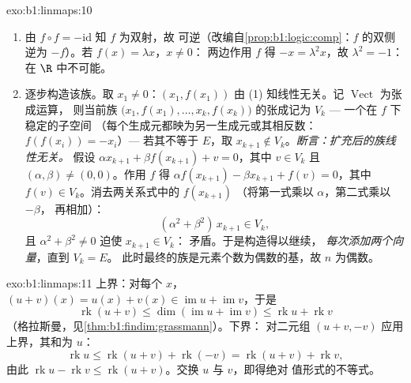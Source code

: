 \begin{solution}{exo:b1:linmaps:10}
\begin{enumerate}
  \item 由 $f \circ f = -\mathrm{id}$ 知 $f$ 为双射，故
        可逆（改编自\cref{prop:b1:logic:comp}：$f$ 的双侧
        逆为 $-f$）。若 $f(x) = \lambda x$，$x \neq 0$：
        两边作用 $f$ 得 $-x = \lambda^2 x$，故 $\lambda^2 = -1$：
        在 $\R$ 中不可能。
  \item 逐步构造该族。取 $x_1 \neq 0$：$(x_1,
        f(x_1))$ 由 (1) 知线性无关。记 $\operatorname{Vect}$ 为张成运算，
        则当前族 $\bigl(x_1, f(x_1), \dots, x_k,
        f(x_k)\bigr)$ 的张成记为 $V_k$ --- 一个在 $f$ 下稳定的子空间
        （每个生成元都映为另一生成元或其相反数：
        $f(f(x_i)) = -x_i$）--- 若其不等于 $E$，取 $x_{k+1}
        \notin V_k$。\emph{断言：扩充后的族线性无关。}
        假设 $\alpha x_{k+1} + \beta f(x_{k+1}) + v = 0$，其中 $v
        \in V_k$ 且 $(\alpha, \beta) \neq (0,0)$。作用 $f$ 得
        $\alpha f(x_{k+1}) - \beta x_{k+1} + f(v) = 0$，其中 $f(v)
        \in V_k$。消去两关系式中的 $f(x_{k+1})$
        （将第一式乘以 $\alpha$，第二式乘以 $-\beta$，
        再相加）：
        \[
        (\alpha^2 + \beta^2)\, x_{k+1} \in V_k ,
        \]
        且 $\alpha^2 + \beta^2 \neq 0$ 迫使 $x_{k+1} \in V_k$：
        矛盾。于是构造得以继续，
        \emph{每次添加两个向量}，直到 $V_k = E$。
        此时最终的族是元素个数为偶数的基，故 $n$ 为偶数。
\end{enumerate}
\end{solution}

\begin{solution}{exo:b1:linmaps:11}
上界：对每个 $x$，$(u + v)(x) = u(x) + v(x) \in
\operatorname{im} u + \operatorname{im} v$，于是
\[
\operatorname{rk}(u + v)
\leq \dim(\operatorname{im} u + \operatorname{im} v)
\leq \operatorname{rk} u + \operatorname{rk} v
\]
（格拉斯曼，见\cref{thm:b1:findim:grassmann}）。下界：
对二元组 $(u + v, -v)$ 应用上界，其和为 $u$：
\[
\operatorname{rk} u \leq \operatorname{rk}(u + v) +
\operatorname{rk}(-v) = \operatorname{rk}(u + v) +
\operatorname{rk} v,
\]
由此 $\operatorname{rk} u - \operatorname{rk} v \leq
\operatorname{rk}(u+v)$。交换 $u$ 与 $v$，即得绝对
值形式的不等式。
\end{solution}

